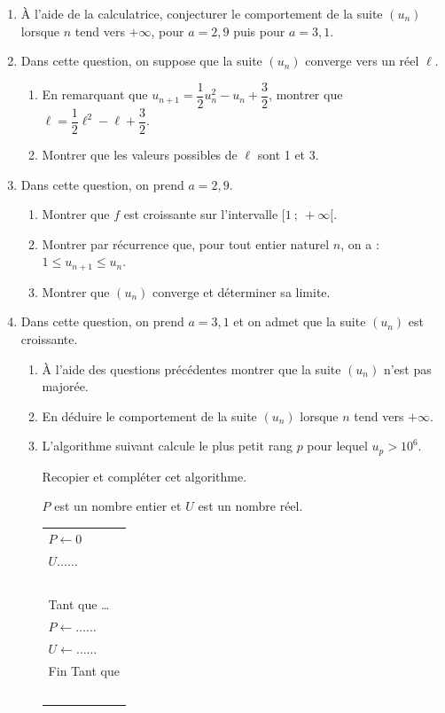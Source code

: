 \documentclass[10pt,a4paper]{article}
\begin{document}
\begin{enumerate}
\item À l'aide de la calculatrice, conjecturer le comportement de la suite $\left(u_n\right)$ lorsque $n$ tend vers $+ \infty$, pour $a = 2,9$ puis pour $a = 3,1$.
\item Dans cette question, on suppose que la suite $\left(u_n\right)$ converge vers un réel $\ell$.
	\begin{enumerate}
		\item En remarquant que $u_{n+1} = \dfrac{1}{2}u_n^2 - u_n + \dfrac{3}{2}$, montrer que $\ell = \dfrac{1}{2}\ell^2 - \ell + \dfrac{3}{2}$.
		\item Montrer que les valeurs possibles de $\ell$ sont 1 et 3.
 	\end{enumerate}
\item  Dans cette question, on prend $a = 2,9$.
	\begin{enumerate}
		\item Montrer que $f$ est croissante sur l'intervalle $[1~;~+ \infty[$.
		\item Montrer par récurrence que, pour tout entier naturel $n$, on a : $1 \leqslant  u_{n+1} \leqslant u_n$.
		\item Montrer que $\left(u_n\right)$ converge et déterminer sa limite.
 	\end{enumerate}
\item Dans cette question, on prend $a = 3,1$ et on admet que la suite $\left(u_n\right)$ est croissante.
	\begin{enumerate}
		\item À l'aide des questions précédentes montrer que la suite $\left(u_n\right)$ n'est pas majorée.
		\item En déduire le comportement de la suite $\left(u_n\right)$ lorsque $n$ tend vers $+ \infty$.
		\item L'algorithme suivant calcule le plus petit rang $p$ pour lequel $u_p > 10^6$.
		
Recopier et compléter cet algorithme. 

$P$ est un nombre entier et $U$ est un nombre réel.

\begin{center}
\begin{tabularx}{0.4\linewidth}{|X|}\hline
$P \gets 0$\\
$U \ldots\ldots$\\
~\\
Tant que \ldots\\
\hspace{0.6cm}$P \gets \ldots\ldots$\\
\hspace{0.6cm}$U \gets \ldots\ldots$\\
Fin Tant que\\
~\\ \hline
\end{tabularx}
\end{center}
 	\end{enumerate}
\end{enumerate}
\end{document}
